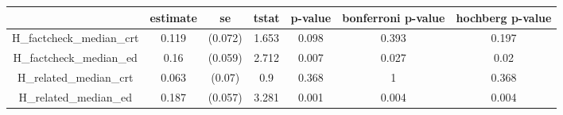 \begin{tabular}{ccccccc}
  \hline
 & estimate & se & tstat & p-value & bonferroni p-value & hochberg p-value \\ 
  \hline
H\_factcheck\_median\_crt & 0.119 & (0.072) & 1.653 & 0.098 & 0.393 & 0.197 \\ 
  H\_factcheck\_median\_ed & 0.16 & (0.059) & 2.712 & 0.007 & 0.027 & 0.02 \\ 
  H\_related\_median\_crt & 0.063 & (0.07) & 0.9 & 0.368 & 1 & 0.368 \\ 
  H\_related\_median\_ed & 0.187 & (0.057) & 3.281 & 0.001 & 0.004 & 0.004 \\ 
   \hline
\end{tabular}
